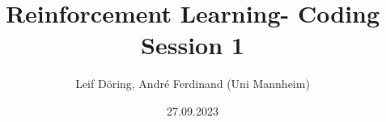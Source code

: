 \documentclass[10pt, aspectratio=169, hyperref={colorlinks = true,linkcolor = blue}]{beamer}
\title{Reinforcement Learning- Coding Session 1}
\subtitle{Leif D\"oring, Andr\'e Ferdinand (Uni Mannheim)}
\date{27.09.2023}
\begin{document}
	\maketitle
	\tableofcontents
	\makeatother
	
	
	 
\end{document}
